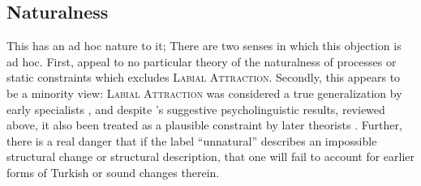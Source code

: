 \subsection{Naturalness}

\citet{Becker2011}

This has an ad hoc nature to it; 
There are two senses in which this objection is ad hoc. 
First, \citeauthor{Becker2011} appeal to no particular theory of the naturalness of processes or static constraints which excludes \textsc{Labial Attraction}. 
Secondly, this appears to be a minority view: \textsc{Labial Attraction} was considered a true generalization by early specialists
\citep[e.g.,][]{Lees1966a}, and despite \citeauthor{Zimmer1969}'s suggestive psycholinguistic results, reviewed above, it also been treated as a plausible constraint by later theorists \citep[e.g.,][]{NiChiosain1993,Ito1993,Ito1995a,Zuraw2000}.
Further, there is a real danger that if the label ``unnatural'' 
describes an impossible structural change or structural description, that one will fail to account for earlier forms of Turkish or sound changes therein.


